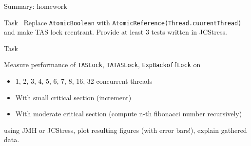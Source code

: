\begin{frame}{Summary: homework}

\begin{homeworkmail}{Task~\taskReentrantTAS}{
    Replace \texttt{AtomicBoolean} with \texttt{AtomicReference(Thread.cuurentThread)} and make TAS lock reentrant. Provide at least 3 tests written in JCStress.
}
\end{homeworkmail}

\begin{homeworkmail}{Task~\taskSpinMeasure}{
    Measure performance of \texttt{TASLock}, \texttt{TATASLock}, \texttt{ExpBackoffLock} on
    \begin{itemize}
      \item 1, 2, 3, 4, 5, 6, 7, 8, 16, 32 concurrent threads
      \item With small critical section (increment)
      \item With moderate critical section (compute n-th fibonacci number recursively)
    \end{itemize}
    using JMH or JCStress, plot resulting figures (with error bars!), explain gathered data.
}
\end{homeworkmail}

\end{frame}


% 
% 
% 
% 
% 


